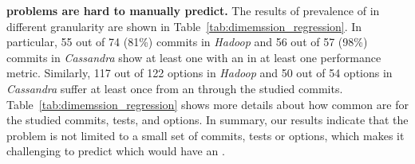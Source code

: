 \noindent \textbf{\inconsistent problems are hard to manually predict.} The results of prevalence of \inconsistent in different granularity are shown in Table~\ref{tab:dimemssion_regression}. In particular, 55 out of 74 (81\%) commits in \emph{Hadoop} and 56 out of 57 (98\%) commits in \emph{Cassandra} show at least one \instance with an \inconsistent in at least one performance metric. %
Similarly, 117 out of 122 options in \emph{Hadoop} and 50 out of 54 options in \emph{Cassandra} suffer at least once from an \inconsistent through the studied commits. Table~\ref{tab:dimemssion_regression} shows more details about how common are \inconsistent for the studied commits, tests, and options. 
In summary, our results indicate that the \inconsistent problem is not limited to a small set of commits, tests or options, which makes it challenging to predict which \instance would have an \inconsistent.

